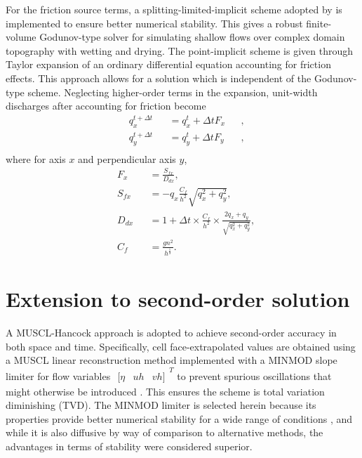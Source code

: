 For the friction source terms, a splitting-limited-implicit scheme adopted by \citet{Liang2010a} is implemented to ensure better numerical stability. This gives a robust finite-volume Godunov-type solver for simulating shallow flows over complex domain topography with wetting and drying. The point-implicit scheme is given through Taylor expansion of an ordinary differential equation accounting for friction effects. This approach allows for a solution which is independent of the Godunov-type scheme. Neglecting higher-order terms in the expansion, unit-width discharges after accounting for friction become
\begin{equation}
	\label{Friction}
	\begin{alignedat}{3}
		&q_{x}^{t+\Delta t} && = q_{x}^{t} + \Delta tF_x && ,\\
		&q_{y}^{t+\Delta t} && = q_{y}^{t} + \Delta tF_y && ,\\
	\end{alignedat}
\end{equation}
where for axis \(x\) and perpendicular axis \(y\),
\begin{equation}
	\label{FrictionPrereq}
	\begin{alignedat}{2}
		&F_x      && = \frac{S_{fx}}{D_{dx}} ,\\
		&S_{fx}   && = -q_x\frac{C_f}{h^2}\sqrt{q_{x}^{2} + q_{y}^{2}} ,\\
		&D_{dx}   && = 1 + \Delta t \times \frac{C_f}{h^2} \times \frac{2q_x + q_y}{\sqrt{q_{x}^{2} + q_{y}^{2}}} ,\\
		&C_f      && = \frac{gn^2}{h^{\frac{1}{3}}} .
	\end{alignedat}
\end{equation}

\section{Extension to second-order solution}

A MUSCL-Hancock approach \citep{VanLeer1984} is adopted to achieve second-order accuracy in both space and time. Specifically, cell face-extrapolated values are obtained using a MUSCL linear reconstruction method implemented with a MINMOD slope limiter \citep{Roe1986} for flow variables \(\begin{matrix}[\eta & uh & vh]\end{matrix}^T\) to prevent spurious oscillations that might otherwise be introduced \citep{Toro2001}. This ensures the scheme is total variation diminishing (TVD). The MINMOD limiter is selected herein because its properties provide better numerical stability for a wide range of conditions \citep{Suresh2000,Yee2006}, and while it is also diffusive by way of comparison to alternative methods, the advantages in terms of stability were considered superior.

